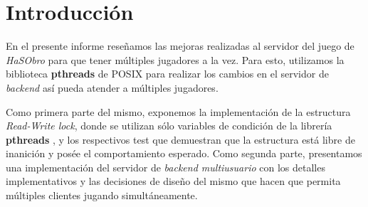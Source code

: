 \section{Introducción}

En el presente informe reseñamos las mejoras realizadas al servidor del juego de \textit{HaSObro} para que tener múltiples jugadores a la vez. Para esto, utilizamos la biblioteca \textbf{pthreads} de POSIX para realizar los cambios en el servidor de \textit{backend} así pueda atender a múltiples jugadores.

Como primera parte del mismo, exponemos la implementación de la estructura \textit{Read-Write lock}, donde se utilizan sólo variables de condición de la librería \textbf{pthreads} , y los respectivos test que demuestran que la estructura está libre de inanición y posée el comportamiento esperado. Como segunda parte, presentamos una implementación del servidor de \textit{backend multiusuario} con los detalles implementativos y las decisiones de diseño del mismo que hacen que permita múltiples clientes jugando simultáneamente.
